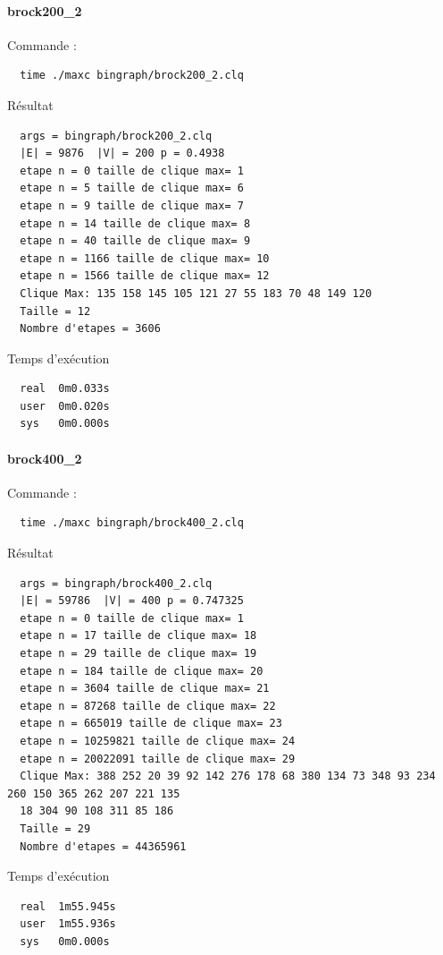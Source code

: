 \documentclass{article}
\begin{document}
\paragraph{brock200\_2}
Commande :
\begin{verbatim}
  time ./maxc bingraph/brock200_2.clq
\end{verbatim}
Résultat
\begin{verbatim}
  args = bingraph/brock200_2.clq
  |E| = 9876  |V| = 200 p = 0.4938
  etape n = 0 taille de clique max= 1
  etape n = 5 taille de clique max= 6
  etape n = 9 taille de clique max= 7
  etape n = 14 taille de clique max= 8
  etape n = 40 taille de clique max= 9
  etape n = 1166 taille de clique max= 10
  etape n = 1566 taille de clique max= 12
  Clique Max: 135 158 145 105 121 27 55 183 70 48 149 120
  Taille = 12
  Nombre d'etapes = 3606
\end{verbatim}
Temps d'exécution
\begin{verbatim}
  real  0m0.033s
  user  0m0.020s
  sys   0m0.000s
\end{verbatim}

\paragraph{brock400\_2}
Commande :
\begin{verbatim}
  time ./maxc bingraph/brock400_2.clq
\end{verbatim}
Résultat
\begin{verbatim}
  args = bingraph/brock400_2.clq
  |E| = 59786  |V| = 400 p = 0.747325
  etape n = 0 taille de clique max= 1
  etape n = 17 taille de clique max= 18
  etape n = 29 taille de clique max= 19
  etape n = 184 taille de clique max= 20
  etape n = 3604 taille de clique max= 21
  etape n = 87268 taille de clique max= 22
  etape n = 665019 taille de clique max= 23
  etape n = 10259821 taille de clique max= 24
  etape n = 20022091 taille de clique max= 29
  Clique Max: 388 252 20 39 92 142 276 178 68 380 134 73 348 93 234 260 150 365 262 207 221 135
  18 304 90 108 311 85 186
  Taille = 29
  Nombre d'etapes = 44365961
\end{verbatim}
Temps d'exécution
\begin{verbatim}
  real  1m55.945s
  user  1m55.936s
  sys   0m0.000s
\end{verbatim}
\end{document}
